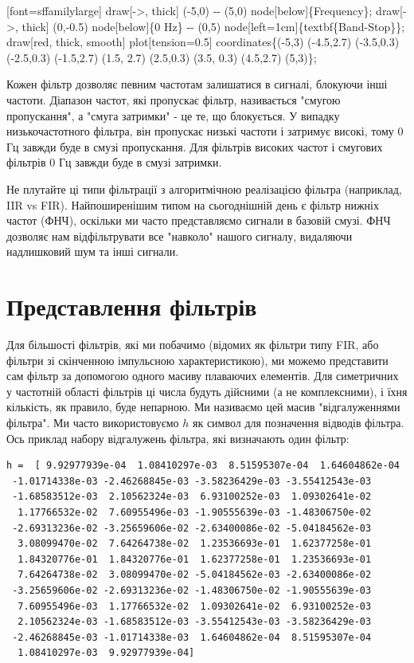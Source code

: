 {[}font=sffamilylarge{]} draw{[}-\textgreater, thick{]} (-5,0) -\/-
(5,0) node{[}below{]}\{Frequency\}; draw{[}-\textgreater, thick{]}
(0,-0.5) node{[}below{]}\{0 Hz\} -\/- (0,5)
node{[}left=1cm{]}\{textbf\{Band-Stop\}\}; draw{[}red, thick, smooth{]}
plot{[}tension=0.5{]} coordinates\{(-5,3) (-4.5,2.7) (-3.5,0.3)
(-2.5,0.3) (-1.5,2.7) (1.5, 2.7) (2.5,0.3) (3.5, 0.3) (4.5,2.7) (5,3)\};

Кожен фільтр дозволяє певним частотам залишатися в сигналі, блокуючи
інші частоти. Діапазон частот, які пропускає фільтр, називається "смугою
пропускання", а "смуга затримки" - це те, що блокується. У випадку
низькочастотного фільтра, він пропускає низькі частоти і затримує
високі, тому 0 Гц завжди буде в смузі пропускання. Для фільтрів високих
частот і смугових фільтрів 0 Гц завжди буде в смузі затримки.

Не плутайте ці типи фільтрації з алгоритмічною реалізацією фільтра
(наприклад, IIR vs FIR). Найпоширенішим типом на сьогоднішній день є
фільтр нижніх частот (ФНЧ), оскільки ми часто представляємо сигнали в
базовій смузі. ФНЧ дозволяє нам відфільтрувати все "навколо" нашого
сигналу, видаляючи надлишковий шум та інші сигнали.

\section{Представлення
фільтрів}\label{ux43fux440ux435ux434ux441ux442ux430ux432ux43bux435ux43dux43dux44f-ux444ux456ux43bux44cux442ux440ux456ux432}

Для більшості фільтрів, які ми побачимо (відомих як фільтри типу FIR,
або фільтри зі скінченною імпульсною характеристикою), ми можемо
представити сам фільтр за допомогою одного масиву плаваючих елементів.
Для симетричних у частотній області фільтрів ці числа будуть дійсними (а
не комплексними), і їхня кількість, як правило, буде непарною. Ми
називаємо цей масив "відгалуженнями фільтра". Ми часто використовуємо
\(h\) як символ для позначення відводів фільтра. Ось приклад набору
відгалужень фільтра, які визначають один фільтр:

\begin{Verbatim}[breaklines=true,breakanywhere=true,fontsize=\small]
h =  [ 9.92977939e-04  1.08410297e-03  8.51595307e-04  1.64604862e-04
 -1.01714338e-03 -2.46268845e-03 -3.58236429e-03 -3.55412543e-03
 -1.68583512e-03  2.10562324e-03  6.93100252e-03  1.09302641e-02
  1.17766532e-02  7.60955496e-03 -1.90555639e-03 -1.48306750e-02
 -2.69313236e-02 -3.25659606e-02 -2.63400086e-02 -5.04184562e-03
  3.08099470e-02  7.64264738e-02  1.23536693e-01  1.62377258e-01
  1.84320776e-01  1.84320776e-01  1.62377258e-01  1.23536693e-01
  7.64264738e-02  3.08099470e-02 -5.04184562e-03 -2.63400086e-02
 -3.25659606e-02 -2.69313236e-02 -1.48306750e-02 -1.90555639e-03
  7.60955496e-03  1.17766532e-02  1.09302641e-02  6.93100252e-03
  2.10562324e-03 -1.68583512e-03 -3.55412543e-03 -3.58236429e-03
 -2.46268845e-03 -1.01714338e-03  1.64604862e-04  8.51595307e-04
  1.08410297e-03  9.92977939e-04]
\end{Verbatim}

